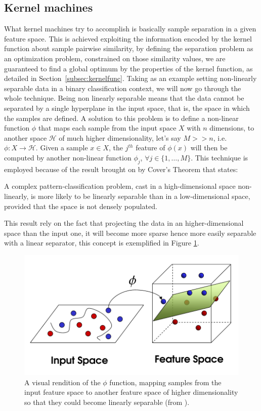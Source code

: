 \subsection{Kernel machines}
\label{subsec:kmachines}

What kernel machines try to accomplish is basically sample separation in a given
feature space.
This is achieved exploiting the information encoded by the kernel function about
sample pairwise similarity, by defining the separation problem as an optimization
problem, constrained on those similarity values, we are guaranteed to find
a global optimum by the properties of the kernel function, as detailed in
Section~\ref{subsec:kernelfunc}.
Taking as an example setting non-linearly separable data in a binary classification
context, we will now go through the whole technique.
Being non linearly separable means that the data cannot be separated by a single
hyperplane in the input space, that is, the space in which the samples are defined.
A solution to this problem is to define a non-linear function $\phi$ that maps each
sample from the input space $X$ with $n$ dimensions, to another space $\mathcal{H}$
of much higher dimensionality, let's say $M >> n$, i.e. $\phi:X\to \mathcal{H}$.
Given a sample $x \in X$, the $j^{th}$ feature of $\phi(x)$ will then be
computed by another non-linear function $\phi_j$, $\forall j \in \{1,\dots,M\}$.
This technique is employed because of the result brought on by Cover's Theorem
that states:

\begin{theorem}
    A complex pattern-classification problem, cast in a high-dimensional space
    non-linearly, is more likely to be linearly separable than in a low-dimensional
    space, provided that the space is not densely populated.
\end{theorem}

This result rely on the fact that projecting the data in an higher-dimensional
space than the input one, it will become more sparse hence more easily separable
with a linear separator, this concept is exemplified in Figure \ref{fig:phi}.

\begin{figure}[ht]
    \centering
    \includegraphics[scale=0.4]{Figures/phi}
    \caption{A visual rendition of the $\phi$ function, mapping samples from the
    input feature space to another feature space of higher dimensionality so that
    they could become linearly separable (from \cite{rtesselli}).}
    \label{fig:phi}
\end{figure}

